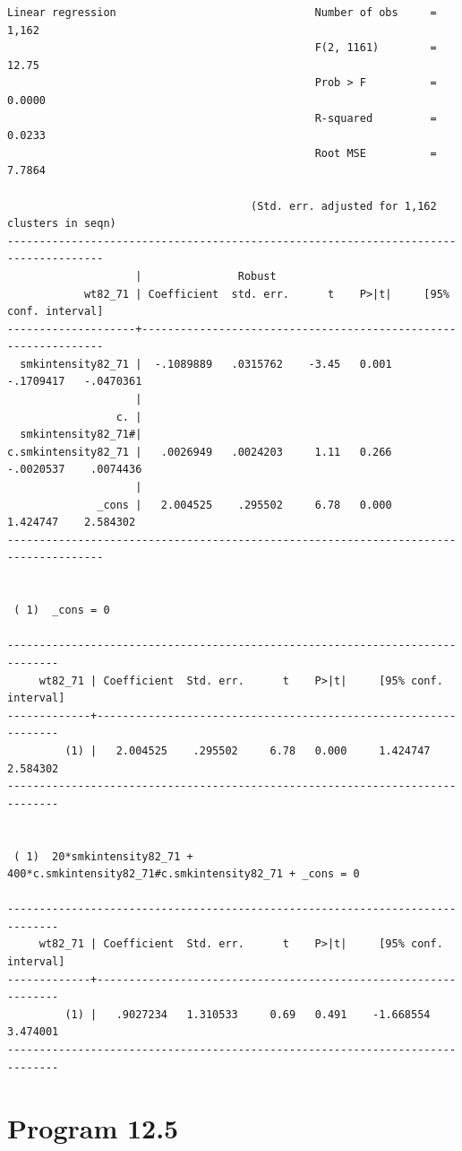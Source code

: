 \documentclass[
  10pt,
  a4paper,
]{book}
\begin{document}
\begin{verbatim}
Linear regression                               Number of obs     =      1,162
                                                F(2, 1161)        =      12.75
                                                Prob > F          =     0.0000
                                                R-squared         =     0.0233
                                                Root MSE          =     7.7864

                                      (Std. err. adjusted for 1,162 clusters in seqn)
-------------------------------------------------------------------------------------
                    |               Robust
            wt82_71 | Coefficient  std. err.      t    P>|t|     [95% conf. interval]
--------------------+----------------------------------------------------------------
  smkintensity82_71 |  -.1089889   .0315762    -3.45   0.001    -.1709417   -.0470361
                    |
                 c. |
  smkintensity82_71#|
c.smkintensity82_71 |   .0026949   .0024203     1.11   0.266    -.0020537    .0074436
                    |
              _cons |   2.004525    .295502     6.78   0.000     1.424747    2.584302
-------------------------------------------------------------------------------------


 ( 1)  _cons = 0

------------------------------------------------------------------------------
     wt82_71 | Coefficient  Std. err.      t    P>|t|     [95% conf. interval]
-------------+----------------------------------------------------------------
         (1) |   2.004525    .295502     6.78   0.000     1.424747    2.584302
------------------------------------------------------------------------------


 ( 1)  20*smkintensity82_71 + 400*c.smkintensity82_71#c.smkintensity82_71 + _cons = 0

------------------------------------------------------------------------------
     wt82_71 | Coefficient  Std. err.      t    P>|t|     [95% conf. interval]
-------------+----------------------------------------------------------------
         (1) |   .9027234   1.310533     0.69   0.491    -1.668554    3.474001
------------------------------------------------------------------------------
\end{verbatim}

\hypertarget{program-12.5-1}{%
\section{Program 12.5}\label{program-12.5-1}}
\end{document}
